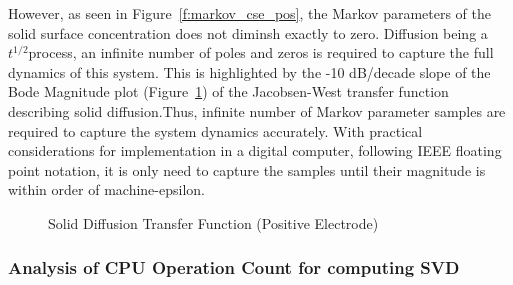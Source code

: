 However, as seen in Figure~\ref{f:markov_cse_pos}, the Markov parameters
of the solid surface concentration does not diminsh exactly to zero.
Diffusion being a $t^{1/2}$process, an infinite number of poles and
zeros is required to capture the full dynamics of this system. This
is highlighted by the -10 dB/decade slope of the Bode Magnitude plot
(Figure~\ref{f:bode}) of the Jacobsen-West transfer function~\citep{JacobsenWest1995}
describing solid diffusion.Thus, infinite number of Markov parameter
samples are required to capture the system dynamics accurately. With
practical considerations for implementation in a digital computer,
following IEEE floating point notation, it is only need to capture
the samples until their magnitude is within order of machine-epsilon.

\begin{figure}[h]

\caption{Solid Diffusion Transfer Function (Positive Electrode)}
\label{f:bode}
\end{figure}

\subsubsection*{Analysis of CPU Operation Count for computing SVD}

